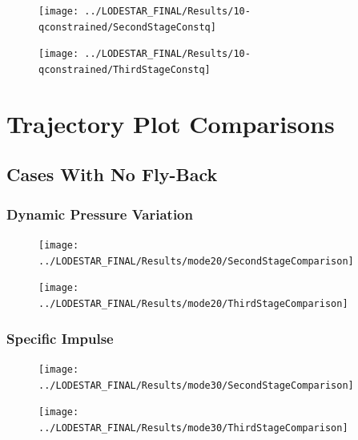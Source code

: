 \begin{figure}[th]
\centering
\texttt{[image: ../LODESTAR\_FINAL/Results/10-qconstrained/SecondStageConstq]}
\caption{}
\label{fig:SecondStageqConstrained68}
\end{figure}

\begin{figure}[th]
\centering
\texttt{[image: ../LODESTAR\_FINAL/Results/10-qconstrained/ThirdStageConstq]}
\caption{}
\label{fig:ThirdStageqConstrained68}
\end{figure}



		
		\chapter{Trajectory Plot Comparisons}\label{sec:Appendix_trajectorycomparisons}
		
		
		\section{Cases With No Fly-Back}
		
		\subsection{Dynamic Pressure Variation}
		
		
\begin{figure}[!ht]
\centering
\texttt{[image: ../LODESTAR\_FINAL/Results/mode20/SecondStageComparison]}
\caption{}
\label{fig:SecondStageComparison1}
\end{figure}

\begin{figure}[!th]
\centering
\texttt{[image: ../LODESTAR\_FINAL/Results/mode20/ThirdStageComparison]}
\caption{}
\label{fig:ThirdStageComparison1}
\end{figure}
\FloatBarrier
\subsection{Specific Impulse}


\begin{figure}[!th]
\centering
\texttt{[image: ../LODESTAR\_FINAL/Results/mode30/SecondStageComparison]}
\caption{}
\label{fig:SecondStageComparison2}

\end{figure}
\begin{figure}[!th]
\centering
\texttt{[image: ../LODESTAR\_FINAL/Results/mode30/ThirdStageComparison]}
\caption{}
\label{fig:ThirdStageComparison2}
\end{figure}
\FloatBarrier
